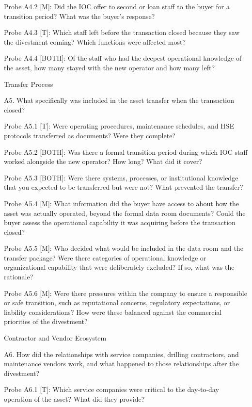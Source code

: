Probe A4.2 {[}M{]}: Did the IOC offer to second or loan staff to the
buyer for a transition period? What was the buyer's response?

Probe A4.3 {[}T{]}: Which staff left before the transaction closed
because they saw the divestment coming? Which functions were affected
most?

Probe A4.4 {[}BOTH{]}: Of the staff who had the deepest operational
knowledge of the asset, how many stayed with the new operator and how
many left?

Transfer Process

A5. What specifically was included in the asset transfer when the
transaction closed?

Probe A5.1 {[}T{]}: Were operating procedures, maintenance schedules,
and HSE protocols transferred as documents? Were they complete?

Probe A5.2 {[}BOTH{]}: Was there a formal transition period during which
IOC staff worked alongside the new operator? How long? What did it
cover?

Probe A5.3 {[}BOTH{]}: Were there systems, processes, or institutional
knowledge that you expected to be transferred but were not? What
prevented the transfer?

Probe A5.4 {[}M{]}: What information did the buyer have access to about
how the asset was actually operated, beyond the formal data room
documents? Could the buyer assess the operational capability it was
acquiring before the transaction closed?

Probe A5.5 {[}M{]}: Who decided what would be included in the data room
and the transfer package? Were there categories of operational knowledge
or organizational capability that were deliberately excluded? If so,
what was the rationale?

Probe A5.6 {[}M{]}: Were there pressures within the company to ensure a
responsible or safe transition, such as reputational concerns,
regulatory expectations, or liability considerations? How were these
balanced against the commercial priorities of the divestment?

Contractor and Vendor Ecosystem

A6. How did the relationships with service companies, drilling
contractors, and maintenance vendors work, and what happened to those
relationships after the divestment?

Probe A6.1 {[}T{]}: Which service companies were critical to the
day-to-day operation of the asset? What did they provide?

